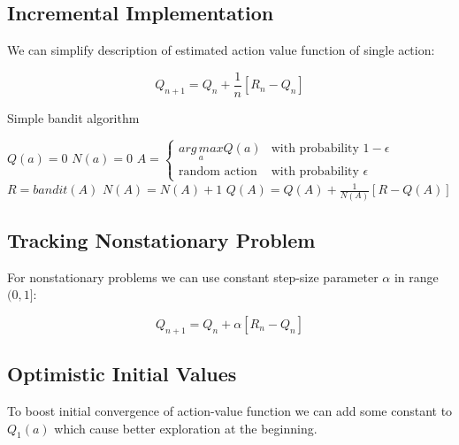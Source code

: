 \documentclass[12pt]{article}
\begin{document}
    \subsection{Incremental Implementation}
    We can simplify description of estimated action value function of single action:

    \begin{equation}
        Q_{n+1} = Q_n +\frac{1}{n} [ R_n - Q_n]
    \end{equation}
    

    \begin{algorithm}
        \caption{Simple bandit algorithm}
        \begin{algorithmic}[1]
            \Procedure{}{}

                \State $Q(a) =0$
                \State $N(a) =0$
            \EndFor
                \State $
                    A =
                \begin{cases}
                    \underset{a}{arg\,max}Q(a) & \text{with probability } 1 - \epsilon\\
                    \text{random action}             & \text{with probability }  \epsilon
                \end{cases}
                $
                \State $R = bandit(A)$
                \State $N(A) = N(A) + 1$
                \State $Q(A) =  Q(A)  +\frac{1}{N(A)} [ R - Q(A) ]$
            \EndWhile
            \EndProcedure
        \end{algorithmic}
    \end{algorithm}
    
    \subsection{Tracking Nonstationary Problem}
    For nonstationary problems we can use constant step-size parameter $\alpha$ in range $(0,1]$:

    \begin{equation}
        Q_{n+1} = Q_n +\alpha [ R_n - Q_n]
    \end{equation}

    \newpage
    \subsection{Optimistic Initial Values}
    To boost initial convergence of action-value function we can add some constant to $Q_1(a)$
    which cause better exploration at the beginning.
\end{document}
